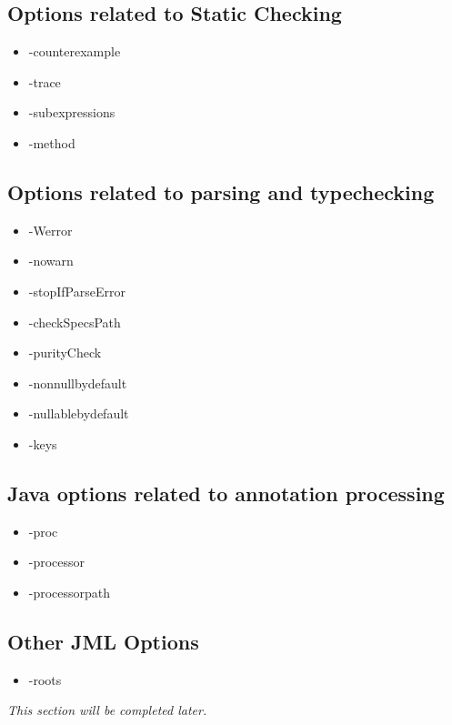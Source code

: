 \subsection{Options related to Static Checking}
\begin{itemize}
\item -counterexample
\item -trace
\item -subexpressions
\item -method
\end{itemize}

\subsection{Options related to parsing and typechecking}
\begin{itemize}
\item -Werror
\item -nowarn
\item -stopIfParseError
\item -checkSpecsPath
\item -purityCheck
\item -nonnullbydefault
\item -nullablebydefault
\item -keys
\end{itemize}

\subsection{Java options related to annotation processing}
\begin{itemize}
\item -proc
\item -processor
\item -processorpath
\end{itemize}

\subsection{Other JML Options}
\begin{itemize}
\item -roots
\end{itemize}


\textit{This section will be completed later.} %


